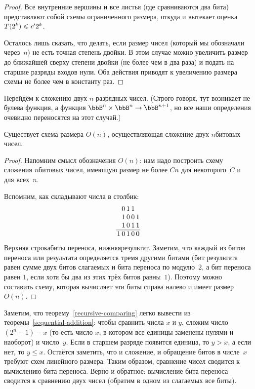 \begin{proof}
Все внутренние вершины и все листья (где
сравниваются два бита) представляют собой схемы
ограниченного размера, откуда и вытекает оценка
$T(2^k)\hm\le c'2^k$.

Осталось лишь сказать, что делать, если размер чисел (который мы
обозначали через~$n$) не есть точная степень двойки. В этом
случае можно увеличить размер до ближайшей сверху степени двойки
(не более чем в два раза) и подать на старшие разряды входов
нули. Оба действия приводят к увеличению размера схемы не более
чем в константу раз.
\end{proof}

Перейдём к сложению двух $n$-разрядных чисел.
(Строго говоря, тут возникает не булева функция, а функция
$\bbB^n\times\bbB^n\to\bbB^{n+1}$, но все наши определения
очевидно переносятся на этот случай.)

\begin{theorem}
        \label{sequential-addition}
Существует схема размера $O(n)$, осуществляющая сложение
двух $n$\д битовых чисел.
\end{theorem}

\begin{proof}
Напомним смысл обозначения $O(n)$: нам надо построить
схему сложения $n$\д битовых чисел, имеющую размер не
более $Cn$ для некоторого~$C$ и для всех~$n$.

Вспомним, как складывают числа в столбик:
{\mysmall
        $$
\arraycolsep=1pt
\begin{array}{rrrrr}
    &        0 &        1 &        1 & \\
    &        1 &        0 &        0 &1\\
    &        1 &        0 &        1 &1\\
\hline
1   &        0 &        1 &        0 &0\\
\end{array}
        $$}%
Верхняя строка\т биты переноса, нижняя\т результат. Заметим, что
каждый из битов переноса или результата определяется тремя
другими битами (бит результата равен сумме двух  битов
слагаемых и бита переноса по модулю~$2$,
а бит переноса равен $1$, если хотя
бы два из этих трёх битов равны~$1$). Поэтому можно составить
схему, которая вычисляет эти биты справа налево и имеет размер $O(n)$.
\end{proof}

Заметим, что теорему~\ref{recursive-comparing} легко вывести из
теоремы~\ref{sequential-addition}: чтобы сравнить числа $x$ и
$y$, сложим число $(2^n-1)-x$ (то есть число $x$, в котором все
единицы заменены нулями и наоборот) и число~$y$. Если в старшем
разряде появится единица, то $y>x$, а если нет, то $y\le x$.
Остаётся заметить, что и сложение, и обращение битов в числе~$x$
требуют схем линейного размера. Таким образом, сравнение чисел
сводится к вычислению бита переноса. Верно и обратное:
вычисление бита переноса сводится к сравнению двух чисел
(обратим в одном из слагаемых все биты).

